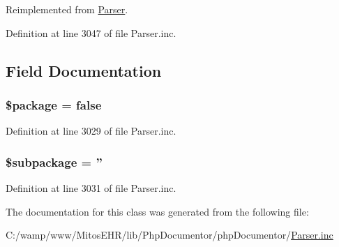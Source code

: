 \-Reimplemented from \hyperlink{class_parser_abe4d21ebe5f9d4088e7be4271603cd5e}{\-Parser}.



\-Definition at line 3047 of file \-Parser.\-inc.




\subsection{\-Field \-Documentation}
\hypertarget{classppage_parser_a365395516cc195292e97e09bc0d165ae}{
\subsubsection[{\$package}]{\setlength{\rightskip}{0pt plus 5cm}\$package = false}}\label{classppage_parser_a365395516cc195292e97e09bc0d165ae}


\-Definition at line 3029 of file \-Parser.\-inc.

\hypertarget{classppage_parser_ac601dc8dc2a086b6381128cc9c7a3fc5}{
\subsubsection[{\$subpackage}]{\setlength{\rightskip}{0pt plus 5cm}\$subpackage = ''}}\label{classppage_parser_ac601dc8dc2a086b6381128cc9c7a3fc5}


\-Definition at line 3031 of file \-Parser.\-inc.



\-The documentation for this class was generated from the following file\-:\begin{DoxyCompactItemize}
\item 
\-C\-:/wamp/www/\-Mitos\-E\-H\-R/lib/\-Php\-Documentor/php\-Documentor/\hyperlink{_parser_8inc}{\-Parser.\-inc}\end{DoxyCompactItemize}
